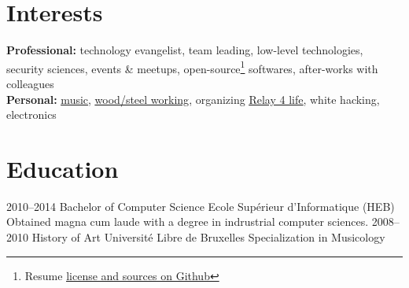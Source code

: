 \documentclass[]{friggeri-cv} %
\begin{document}

\section{Interests}

\textbf{Professional:} technology evangelist, team leading, low-level technologies, security sciences, events \& meetups, open-source\footnote{Resume \href{https://github.com/rmedaer/me}{\ul{license and sources on Github}}} softwares, after-works with colleagues \\
\textbf{Personal:}
\href{https://www.facebook.com/majorset}{\ul{music}},
\href{https://www.lairdubois.fr/pas-a-pas/268-meuble-tv-chester-2.html}{\ul{wood/steel working}},
organizing \href{http://www.relaispourlavie.be/relays/braine-lalleud-2017#block-views-stkrfl-contacts-main-block-1}{\ul{Relay 4 life}},
white hacking,
electronics


\section{Education}

\begin{entrylist}
\entry
{2010--2014}
{Bachelor {\normalfont of Computer Science}}
{Ecole Supérieur d'Informatique (HEB)}
{Obtained magna cum laude with a degree in indrustrial computer sciences.}
\entry
{2008--2010}
{{\normalfont History of Art}}
{Université Libre de Bruxelles}
{Specialization in Musicology}
\end{entrylist}
\end{document}
